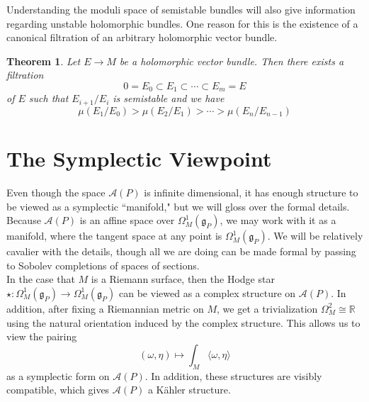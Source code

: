 \documentclass[psamsfonts, 12pt]{amsart}
\newtheorem{thm}{Theorem}[section]
\theoremstyle{definition}
\theoremstyle{remark}
\newcommand{\R}{\mathbb{R}}
\newcommand{\g}{\mathfrak{g}}
\begin{document}
Understanding the moduli space of semistable bundles will also give
information regarding unstable holomorphic bundles. One reason for this is
the existence of a canonical filtration of an arbitrary holomorphic vector bundle.
%
\begin{thm}
Let $E \to M$ be a holomorphic vector bundle. Then there exists a filtration
\[
0 = E_0 \subset E_1 \subset \cdots \subset E_m = E
\]
of $E$ such that $E_{i+1}/E_i$ is semistable and we have
\[
\mu(E_1/E_0) > \mu(E_2/E_1) > \cdots > \mu(E_n/E_{n-1})
\]
\end{thm}
%
\section{The Symplectic Viewpoint}
%
Even though the space $\mathscr{A}(P)$ is infinite dimensional, it has enough structure
to be viewed as a symplectic ``manifold," but we will gloss over the formal details.
Because $\mathcal{A}(P)$ is an affine space over $\Omega_M^1(\g_P)$, we may
work with it as a manifold, where the tangent space at any point is $\Omega_M^1(\g_P)$.
We will be relatively cavalier with the details, though all we are doing can be made
formal by passing to Sobolev completions of spaces of sections. \\

In the case that $M$ is a Riemann surface, then the Hodge star
$\star : \Omega^1_M(\g_P) \to \Omega^1_M(\g_P)$ can be viewed as a complex
structure on $\mathscr{A}(P)$. In addition, after fixing a Riemannian metric on $M$,
we get a trivialization $\Omega_M^2 \cong \R$ using the natural orientation induced
by the complex structure. This allows us to view the pairing
\[
(\omega,\eta) \mapsto \int_M \langle\omega,\eta\rangle
\]
as a symplectic form on $\mathscr{A}(P)$. In addition, these structures are
visibly compatible, which gives $\mathscr{A}(P)$ a K\"ahler structure. \\
\end{document}
